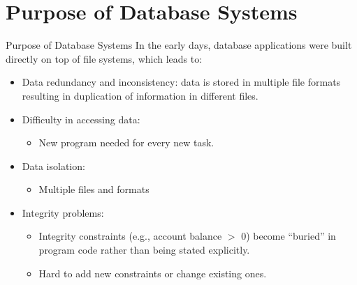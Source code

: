 \documentclass[aspectratio=169]{beamer}
\begin{document}
\section{Purpose of Database Systems}

\begin{frame}{Purpose of Database Systems}
    In the early days, database applications were built directly on top of file systems, which leads to:
    \begin{itemize}
        \pause
        \item Data redundancy and inconsistency: data is stored  in multiple file formats resulting in duplication of information in different files.
        \pause
        \item Difficulty in accessing data:
        \begin{itemize}
            \item New program needed for every new task.
        \end{itemize}
        \pause
        \item Data isolation:
        \begin{itemize}
            \item Multiple files and formats
        \end{itemize}
        \pause
        \item Integrity problems:
        \begin{itemize}
            \item Integrity constraints  (e.g., account balance $>$ 0) become ``buried'' in program code rather than being stated explicitly.
            \item Hard to add new constraints or change existing ones.
        \end{itemize}
    \end{itemize}
\end{frame}
\end{document}
